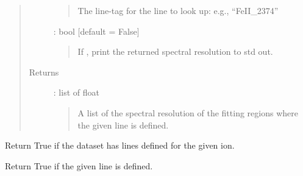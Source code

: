 \documentclass[letterpaper,10pt,english]{sphinxmanual}
\begin{document}
\begin{fulllineitems}
\begin{fulllineitems}
\begin{quote}
\begin{description}
\begin{quote}
The line-tag for the line to look up: e.g., “FeII\_2374”
\end{quote}

 : bool   {[}default = False{]}
\begin{quote}

If , print the returned spectral resolution to std out.
\end{quote}

\item[{Returns}] \leavevmode
{} : list of float
\begin{quote}

A list of the spectral resolution of the fitting regions
where the given line is defined.
\end{quote}

\end{description}\end{quote}

\end{fulllineitems}


\begin{fulllineitems}
\label{\detokenize{api:VoigtFit.DataSet.has_ion}}
Return True if the dataset has lines defined for the given ion.

\end{fulllineitems}


\begin{fulllineitems}
\label{\detokenize{api:VoigtFit.DataSet.has_line}}
Return True if the given line is defined.

\end{fulllineitems}



\end{fulllineitems}
\end{document}
